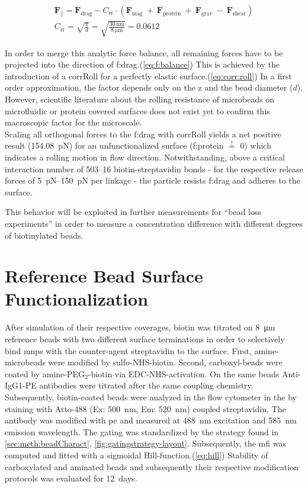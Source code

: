 \begin{align}
	\mathbf{F}_\parallel = \mathbf{F}_\text{drag} - C_\text{rr} \cdot (\mathbf{F}_\text{mag} \ +\ \mathbf{F}_\text{protein}  \ +\ \mathbf{F}_\text{grav}\ -\ \mathbf{F}_\text{shear} ) \label{eq:f:balance} \\
	C_\text{rr} = \sqrt{\frac{\text{z}}{d}} = \sqrt{\frac{\SI{30}{\nano\meter}}{\SI{8}{\micro\meter}}} = \num{0.0612} \label{eq:corr:roll}
\end{align}

In order to merge this analytic force balance, all remaining forces have to be projected into the direction of \acrfull{f:drag}.(\cref{eq:f:balance}) This is achieved by the introduction of a \gls{corrRoll} for a perfectly elastic surface.(\cref{eq:corr:roll}) In a first order approximation, the factor depends only on the \acrfull{z} and the bead diameter ($d$). However, scientific literature about the rolling resistance of microbeads on microfluidic or protein covered surfaces does not exist yet to confirm this macroscopic factor for the microscale. \\
Scaling all orthogonal forces to the \acrlong{f:drag} with \gls{corrRoll} yields a net positive result (\SI{154.08}{\pico\newton}) for an unfunctionalized surface (\gls{f:protein} $\overset{!}{=}$ \num{0}) which indicates a rolling motion in flow direction. Notwithstanding, above a critical interaction number of \numrange{503}{16} biotin-streptavidin bonds - for the respective release forces of \SIrange{5}{150}{\pico\newton} per linkage - the particle resists \acrlong{f:drag} and adheres to the surface.

This behavior will be exploited in further measurements for ``bead loss experiments'' in order to measure a concentration difference with different degrees of biotinylated beads.


\clearpage
\section{Reference Bead Surface Functionalization}
\label{sec:res:beadFunc}
After simulation of their respective coverages, biotin was titrated on \SI{8}{\micro\meter} reference beads with two different surface terminations in order to selectively bind \glspl{mnp} with the counter-agent streptavidin to the surface. First, \gls{amine}-microbeads were modified by sulfo-NHS-biotin. Second, \gls{carboxyl}-beads were coated by amine-PEG$_2$-biotin via EDC-NHS-activation. On the same beads Anti-IgG1-PE antibodies were titrated after the same coupling chemistry.\\
Subsequently, biotin-coated beads were analyzed in the flow cytometer in the by staining with Atto-488 (Ex: \SI{500}{\nano\meter}, Em: \SI{520}{\nano\meter}) coupled streptavidin. The antibody was modified with \gls{pe} and measured at \SI{488}{\nano\meter} excitation and \SI{585}{\nano\meter}  emission wavelength. The gating was standardized by the strategy found in \cref{sec:meth:beadCharact}, \cref{fig:gatingstrategy-layout}. Subsequently, the \gls{mfi} was computed and fitted with a sigmoidal Hill-function.(\cref{eq:hill}) Stability of carboxylated and aminated beads and subsequently their respective modification protocols was evaluated for \SI{12}{days}.


